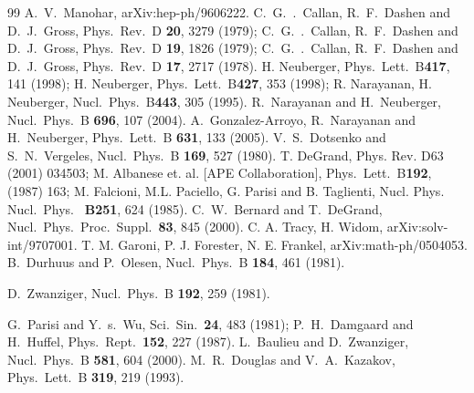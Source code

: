 \begin{thebibliography}{99}
  A.~V.~Manohar,
  arXiv:hep-ph/9606222.
C.~G.~.~Callan, R.~F.~Dashen and D.~J.~Gross,
  Phys.\ Rev.\ D {\bf 20}, 3279 (1979);
 C.~G.~.~Callan, R.~F.~Dashen and D.~J.~Gross,
  Phys.\ Rev.\ D {\bf 19}, 1826 (1979);
 C.~G.~.~Callan, R.~F.~Dashen and D.~J.~Gross,
  Phys.\ Rev.\ D {\bf 17}, 2717 (1978).
H. Neuberger, Phys.\ Lett.\ B{\bf 417}, 141 (1998);
H. Neuberger, Phys.\ Lett.\ B{\bf 427},  353 (1998);
R. Narayanan, H. Neuberger,
Nucl.\ Phys.\ B{\bf 443}, 305 (1995).
R.~Narayanan and H.~Neuberger,
  Nucl.\ Phys.\ B {\bf 696}, 107 (2004).
 A.~Gonzalez-Arroyo, R.~Narayanan and H.~Neuberger,
  Phys.\ Lett.\ B {\bf 631}, 133 (2005).
 V.~S.~Dotsenko and S.~N.~Vergeles,
  Nucl.\ Phys.\ B {\bf 169}, 527 (1980).
T. DeGrand, Phys. Rev. D63 (2001) 034503;
M. Albanese et. al. [APE Collaboration], Phys.\ Lett.\ B{\bf 192}, (1987) 163;
M. Falcioni, M.L. Paciello, G. Parisi and B. Taglienti, Nucl. Phys. Nucl.\ Phys.\ {\bf
B251}, 624 (1985).
C.~W.~Bernard and T.~DeGrand,
  Nucl.\ Phys.\ Proc.\ Suppl.\  {\bf 83}, 845 (2000).
 C. A. Tracy, H. Widom, arXiv:solv-int/9707001.
 T. M. Garoni, P. J. Forester, N. E. Frankel,
arXiv:math-ph/0504053.
B.~Durhuus and P.~Olesen,
  Nucl.\ Phys.\ B {\bf 184}, 461 (1981).

D.~Zwanziger,
  Nucl.\ Phys.\ B {\bf 192}, 259 (1981).

G.~Parisi and Y.~s.~Wu,
  Sci.\ Sin.\  {\bf 24}, 483 (1981);
P.~H.~Damgaard and H.~Huffel,
  Phys.\ Rept.\  {\bf 152}, 227 (1987).
L.~Baulieu and D.~Zwanziger,
  Nucl.\ Phys.\ B {\bf 581}, 604 (2000).
M.~R.~Douglas and V.~A.~Kazakov,
  Phys.\ Lett.\ B {\bf 319}, 219 (1993).


\end{thebibliography}
